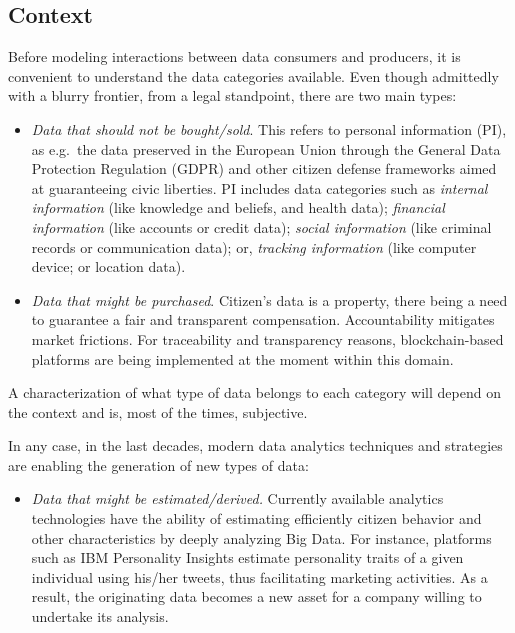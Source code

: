 


\subsection{Context}
Before modeling interactions between data consumers and producers, it is convenient to understand the data categories available. 
Even though admittedly with a blurry frontier, 
from a legal standpoint, there are two main types:

\begin{itemize}
\item {\em Data that should not be bought/sold}. This refers to  
 personal information (PI), as e.g.\ the data preserved in the European
 Union through 
 the General 
 Data Protection Regulation (GDPR) \cite{gdpr} and other citizen defense frameworks
 aimed at guaranteeing civic liberties. PI includes 
 data categories such as 
{\em internal information} (like knowledge and beliefs, %
 and health %
 data); 
{\em financial information} (like accounts or %
 credit data);
{\em social information} (like %
criminal records %
or communication data); or,
{\em tracking information} (like computer device; 
or location data).
%
\item {\em Data that might be purchased}. Citizen’s data is a property,
there being a need to guarantee a fair and transparent compensation.
Accountability mitigates market frictions. For
traceability and transparency reasons,
blockchain-based platforms are being implemented at the moment within this domain.
\end{itemize}
  A characterization of what type of data 
  belongs to each category will depend on the context and is, most of the times, subjective.

In any case, in the last decades, modern data analytics techniques and strategies are enabling the generation of new types of data:
\begin{itemize}
\item {\em Data that might be estimated/derived.}  Currently available analytics technologies have the ability of estimating efficiently citizen behavior and other characteristics by deeply analyzing Big Data. For instance, platforms such as IBM Personality Insights \cite{ibm} estimate personality traits of a
given individual using his/her tweets, thus facilitating marketing activities.
As a result, the originating data becomes a new asset for a company
willing to undertake its analysis.
\end{itemize}

